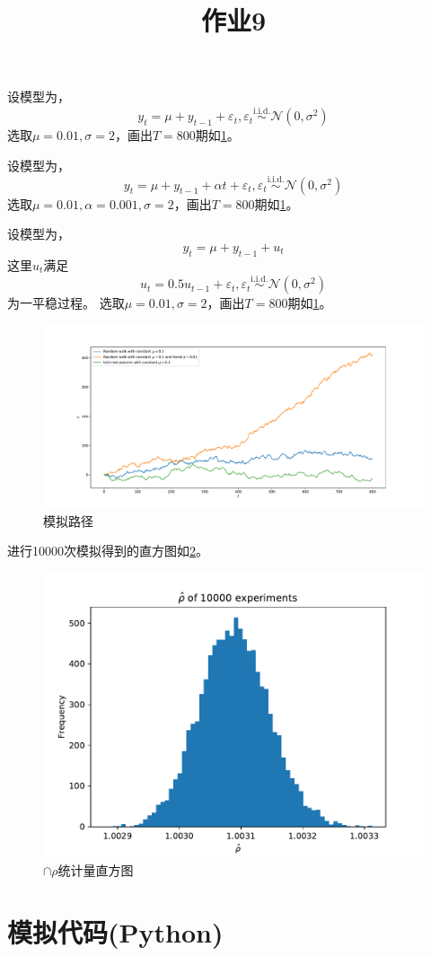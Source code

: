 \documentclass[cn]{homework}
\title{作业9}
\begin{document}
    \maketitle
    \problem[带常数项的随机游走过程]
    设模型为，
    \[y_t=\mu+y_{t-1}+\varepsilon_t,
    \varepsilon_t\overset{\text{i.i.d.}}\sim\mathcal N(0,\sigma^2)\]
    选取$\mu=0.01,\sigma=2$，画出$T=800$期如\cref{fig:seq}。

    \problem[带常数和趋势项的随机游走]
    设模型为，
    \[y_t=\mu+y_{t-1}+\alpha t+\varepsilon_t,
    \varepsilon_t\overset{\text{i.i.d.}}\sim\mathcal N(0,\sigma^2)\]
    选取$\mu=0.01,\alpha=0.001,\sigma=2$，画出$T=800$期如\cref{fig:seq}。


    \problem[带常数项的单位根过程]
    设模型为，
    \[y_t=\mu+y_{t-1}+u_t\]
    这里$u_t$满足 
    \[u_t=0.5u_{t-1}+\varepsilon_t,
    \varepsilon_t\overset{\text{i.i.d.}}\sim\mathcal N(0,\sigma^2)\]
    为一平稳过程。
    选取$\mu=0.01,\sigma=2$，画出$T=800$期如\cref{fig:seq}。

    \begin{figure}[h]
        \centering
        \includegraphics[width=\textwidth]{seq}
        \caption{模拟路径}
        \label{fig:seq}
    \end{figure}

    \problem[第二种情况rho统计量]
    进行10000次模拟得到的直方图如\cref{fig:rho}。
    \begin{figure}[h]
        \centering
        \includegraphics[width=\textwidth]{rho}
        \caption{$\cap\rho$统计量直方图}
        \label{fig:rho}
    \end{figure}

    \newpage
    \appendix
    \section{模拟代码(Python)}
    
\end{document}
